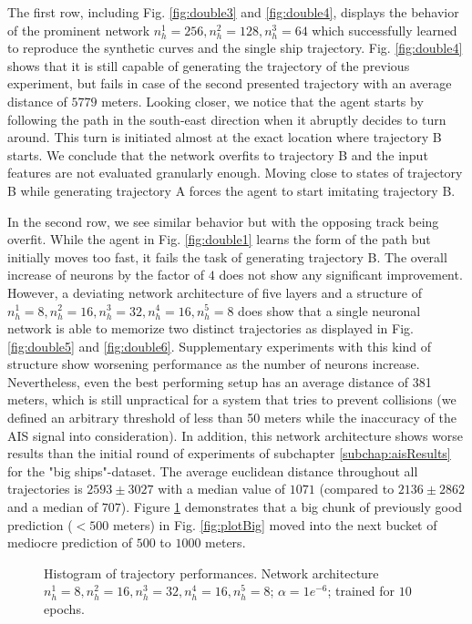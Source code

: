 The first row, including Fig. \ref{fig:double3} and \ref{fig:double4}, displays the behavior of the prominent network $n_h^1=256, n_h^2=128, n_h^3=64$ which successfully learned to reproduce the synthetic curves and the single ship trajectory. Fig. \ref{fig:double4} shows that it is still capable of generating the trajectory of the previous experiment, but fails in case of the second presented trajectory with an average distance of $5779$ meters. Looking closer, we notice that the agent starts by following the path in the south-east direction when it abruptly decides to turn around. This turn is initiated almost at the exact location where trajectory B starts. We conclude that the network overfits to trajectory B and the input features are not evaluated granularly enough. Moving close to states of trajectory B while generating trajectory A forces the agent to start imitating trajectory B.
\par
In the second row, we see similar behavior but with the opposing track being overfit. While the agent in Fig. \ref{fig:double1} learns the form of the path but initially moves too fast, it fails  the task of generating trajectory B. The overall increase of neurons by the factor of $4$ does not show any significant improvement. However, a deviating network architecture of five layers and a structure of $n_h^1=8, n_h^2=16, n_h^3=32, n_h^4=16, n_h^5=8$ does show that a single neuronal network is able to memorize two distinct trajectories as displayed in Fig. \ref{fig:double5} and \ref{fig:double6}. Supplementary experiments with this kind of structure show worsening performance as the number of neurons increase. Nevertheless, even the best performing setup has an average distance of 381 meters, which is still unpractical for a system that tries to prevent collisions (we defined an arbitrary threshold of less than 50 meters while the inaccuracy of the AIS signal into consideration). In addition, this network architecture shows worse results than the initial round of experiments of subchapter \ref{subchap:aisResults} for the "big ships"-dataset. The average euclidean distance throughout all trajectories is $2593 \pm 3027$ with a median value of $1071$ (compared to $2136 \pm 2862$ and a median of $707$). Figure \ref{fig:finalBarPlot} demonstrates that a big chunk of previously good prediction ($<500$ meters) in Fig. \ref{fig:plotBig} moved into the next bucket of mediocre prediction of $500$ to $1000$ meters. 
\begin{figure}[H]
    \centering
    
    \caption{Histogram of trajectory performances. Network architecture $n_h^1=8, n_h^2=16, n_h^3=32, n_h^4=16, n_h^5=8$; $\alpha=1e^{-6}$; trained for $10$ epochs.}
    \label{fig:finalBarPlot}
\end{figure}

